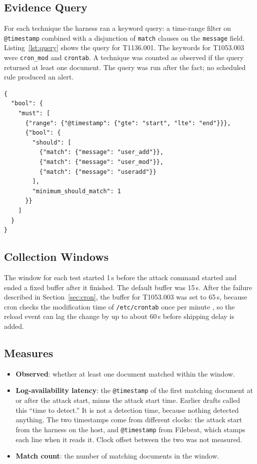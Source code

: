 \documentclass[11pt,a4paper]{article}
\begin{document}
\subsection{Evidence Query}
\label{sec:query}

For each technique the harness ran a keyword query: a time-range filter on
\texttt{@timestamp} combined with a disjunction of \texttt{match} clauses on
the \texttt{message} field. Listing~\ref{lst:query} shows the query for
T1136.001. The keywords for T1053.003 were \texttt{cron\_mod} and
\texttt{crontab}. A technique was counted as observed if the query returned at
least one document. The query was run after the fact; no scheduled rule
produced an alert.

\begin{lstlisting}[caption={Evidence query for T1136.001},label={lst:query}]
{
  "bool": {
    "must": [
      {"range": {"@timestamp": {"gte": "start", "lte": "end"}}},
      {"bool": {
        "should": [
          {"match": {"message": "user_add"}},
          {"match": {"message": "user_mod"}},
          {"match": {"message": "useradd"}}
        ],
        "minimum_should_match": 1
      }}
    ]
  }
}
\end{lstlisting}

\subsection{Collection Windows}

The window for each test started 1\,s before the attack command started and
ended a fixed buffer after it finished. The default buffer was 15\,s. After
the failure described in Section~\ref{sec:cron}, the buffer for T1053.003 was
set to 65\,s, because cron checks the modification time of
\texttt{/etc/crontab} once per minute \cite{cron-man}, so the reload event can
lag the change by up to about 60\,s before shipping delay is added.

\subsection{Measures}

\begin{itemize}
    \item \textbf{Observed}: whether at least one document matched within the
    window.
    \item \textbf{Log-availability latency}: the \texttt{@timestamp} of the
    first matching document at or after the attack start, minus the attack
    start time. Earlier drafts called this ``time to detect.'' It is not a
    detection time, because nothing detected anything. The two timestamps come
    from different clocks: the attack start from the harness on the host, and
    \texttt{@timestamp} from Filebeat, which stamps each line when it reads
    it. Clock offset between the two was not measured.
    \item \textbf{Match count}: the number of matching documents in the window.
\end{itemize}
\end{document}
